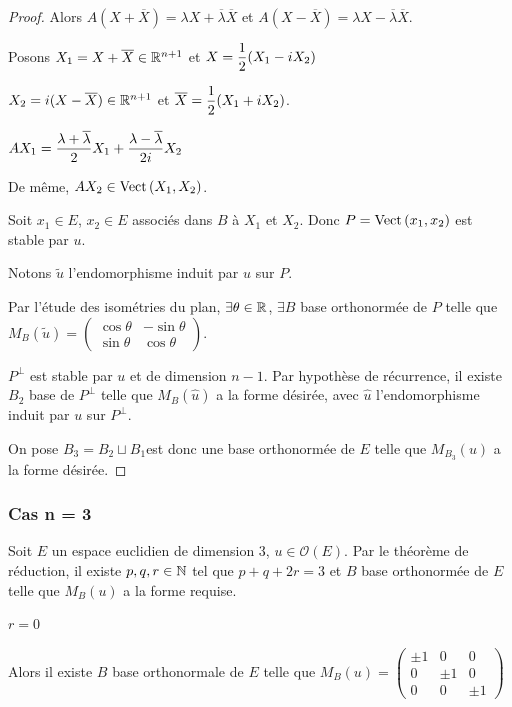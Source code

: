 \begin{proof}
    Alors $A (X + \overline X) = \lambda X + \overline \lambda \overline X$ 
    et $A (X - \overline X) = \lambda X - \overline \lambda \overline X$.

    Posons $X_1 = X + \overline X \in \mathbb{R}^{n + 1}$ et $X = \displaystyle \frac 1 2 (X_1 - iX_2)$

    $X_2 = i(X - \overline X) \in \mathbb{R}^{n + 1}$ et $\overline X = \displaystyle \frac 1 {2} (X_1 + i X_2)$.

    $\displaystyle A X_1 = \frac{\lambda + \overline \lambda}{2} X_1 + \frac{\lambda - \overline \lambda}{2i} X_2$ 

    De même, $A X_2 \in \operatorname{Vect} \,(X_1, X_2)$. 

    Soit $x_1 \in E$, $x_2 \in E$ associés dans $B$ à $X_1$ et $X_2$. Donc 
    $P = \operatorname{Vect} \,(x_1, x_2)$ est stable par $u$. 

    Notons $\tilde u$ l'endomorphisme induit par $u$ sur $P$. 

    Par l'étude des isométries du plan, $\exists \theta \in \mathbb{R}$, $\exists B$ base orthonormée de 
    $P$ telle que $M_B(\tilde u) = \begin{pmatrix}
        \cos \theta & -\sin \theta \\
        \sin \theta & \cos \theta
    \end{pmatrix}$.

    $P^\perp$ est stable par $u$ et de dimension $n - 1$. Par hypothèse de récurrence, 
    il existe $B_2$ base de $P^\perp$ telle que 
    $M_B(\hat u)$ a la forme désirée, avec $\hat u$ l'endomorphisme induit par $u$ sur $P^\perp$.

    On pose $B_3 = B_2 \sqcup B_1$est donc une base orthonormée de $E$ telle que 
    $M_{B_3}(u)$ a la forme désirée.
\end{proof}

\subsubsection{Cas n = 3}

Soit $E$ un espace euclidien de dimension 3, $u \in \mathcal O(E)$. 
Par le théorème de réduction, il existe $p, q, r \in \mathbb{N}$ tel que 
$p + q +2r = 3$ et $B$ base orthonormée de $E$ telle que $M_B(u)$ a la forme 
requise. 

 $r = 0$

\svspace Alors il existe $B$ base orthonormale de $E$ telle que $M_B(u) = \begin{pmatrix}
    \pm 1 & 0 & 0 \\
    0 & \pm 1 & 0 \\
    0 & 0 & \pm 1
\end{pmatrix}$ 

